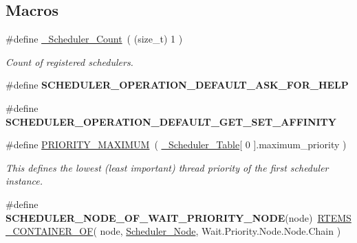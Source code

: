 \subsection*{Macros}
\begin{DoxyCompactItemize}
\item 
\#define \mbox{\hyperlink{group__RTEMSScoreScheduler_ga31e91c7ee7890178b2292e5ecb7d75a7}{\+\_\+\+Scheduler\+\_\+\+Count}}~( (size\+\_\+t) 1 )
\begin{DoxyCompactList}\small\item\em Count of registered schedulers. \end{DoxyCompactList}\item 
\mbox{\label{group__RTEMSScoreScheduler_ga0392f472d0bba1fae39736e6dbd6ab3b}} 
\#define {\bfseries S\+C\+H\+E\+D\+U\+L\+E\+R\+\_\+\+O\+P\+E\+R\+A\+T\+I\+O\+N\+\_\+\+D\+E\+F\+A\+U\+L\+T\+\_\+\+A\+S\+K\+\_\+\+F\+O\+R\+\_\+\+H\+E\+LP}
\item 
\mbox{\label{group__RTEMSScoreScheduler_ga7c80b63d5dfb24d8cde13ca9acef5039}} 
\#define {\bfseries S\+C\+H\+E\+D\+U\+L\+E\+R\+\_\+\+O\+P\+E\+R\+A\+T\+I\+O\+N\+\_\+\+D\+E\+F\+A\+U\+L\+T\+\_\+\+G\+E\+T\+\_\+\+S\+E\+T\+\_\+\+A\+F\+F\+I\+N\+I\+TY}
\item 
\mbox{\label{group__RTEMSScoreScheduler_gab7c07fb14f7e623a215c904a163c4f4d}} 
\#define \mbox{\hyperlink{group__RTEMSScoreScheduler_gab7c07fb14f7e623a215c904a163c4f4d}{P\+R\+I\+O\+R\+I\+T\+Y\+\_\+\+M\+A\+X\+I\+M\+UM}}~( \mbox{\hyperlink{group__RTEMSScoreScheduler_ga5810660559bc51e3083fe09f9b70878c}{\+\_\+\+Scheduler\+\_\+\+Table}}\mbox{[} 0 \mbox{]}.maximum\+\_\+priority )
\begin{DoxyCompactList}\small\item\em This defines the lowest (least important) thread priority of the first scheduler instance. \end{DoxyCompactList}\item 
\mbox{\label{group__RTEMSScoreScheduler_gaffb588825e728f47705f967c3c156a45}} 
\#define {\bfseries S\+C\+H\+E\+D\+U\+L\+E\+R\+\_\+\+N\+O\+D\+E\+\_\+\+O\+F\+\_\+\+W\+A\+I\+T\+\_\+\+P\+R\+I\+O\+R\+I\+T\+Y\+\_\+\+N\+O\+DE}(node)~\mbox{\hyperlink{group__RTEMSScoreBaseDefs_gab2e7a0141fd898ae358fa9b134aa2610}{R\+T\+E\+M\+S\+\_\+\+C\+O\+N\+T\+A\+I\+N\+E\+R\+\_\+\+OF}}( node, \mbox{\hyperlink{structScheduler__Node}{Scheduler\+\_\+\+Node}}, Wait.\+Priority.\+Node.\+Node.\+Chain )

\end{DoxyCompactItemize}
